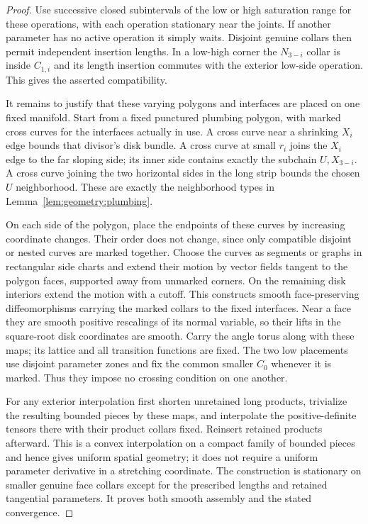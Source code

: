 \begin{proof}
Use successive closed subintervals of the low or high
saturation range for these operations, with each operation
stationary near the joints.  If another parameter has no
active operation it simply waits.  Disjoint genuine collars
then permit independent insertion lengths.  In a low-high
corner the $N_{3-i}$ collar is inside $C_{1,i}$ and its
length insertion commutes with the exterior low-side
operation.  This gives the asserted compatibility.

It remains to justify that these varying polygons and
interfaces are placed on one fixed manifold.  Start from a
fixed punctured plumbing polygon, with marked cross curves
for the interfaces actually in use.  A cross curve near a
shrinking $X_i$ edge bounds that divisor's disk bundle.  A
cross curve at small $r_i$ joins the $X_i$ edge to the far
sloping side; its inner side contains exactly the subchain
$U,X_{3-i}$.  A cross curve joining the two horizontal sides
in the long strip bounds the chosen $U$ neighborhood.  These
are exactly the neighborhood types in
Lemma~\ref{lem:geometry:plumbing}.

On each side of the polygon, place the endpoints of these
curves by increasing coordinate changes.  Their order does
not change, since only compatible disjoint or nested curves
are marked together.  Choose the curves as segments or
graphs in rectangular side charts and extend their motion
by vector fields tangent to the polygon faces, supported
away from unmarked corners.  On the remaining disk interiors
extend the motion with a cutoff.  This constructs smooth
face-preserving diffeomorphisms carrying the marked collars
to the fixed interfaces.  Near a face they are smooth
positive rescalings of its normal variable, so their lifts
in the square-root disk coordinates are smooth.  Carry the
angle torus along with these maps; its lattice and all
transition functions are fixed.  The two low placements use
disjoint parameter zones and fix the common smaller
$C_0$ whenever it is marked.  Thus they impose no crossing
condition on one another.

For any exterior interpolation first shorten unretained
long products, trivialize the resulting bounded pieces by
these maps, and interpolate the positive-definite tensors
there with their product collars fixed.  Reinsert retained
products afterward.  This is a convex interpolation on a
compact family of bounded pieces and hence gives uniform
spatial geometry; it does not require a uniform parameter
derivative in a stretching coordinate.  The construction
is stationary on smaller genuine face collars except for
the prescribed lengths and retained tangential parameters.
It proves both smooth assembly and the stated convergence.
\end{proof}


